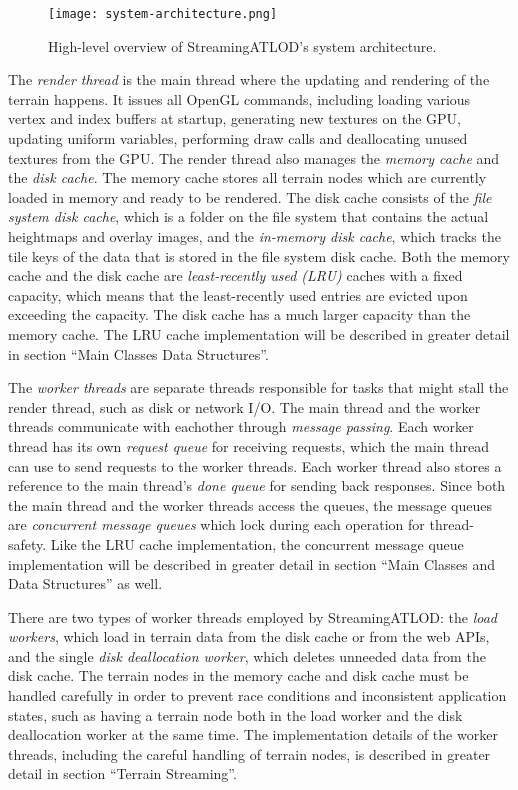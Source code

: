 \begin{figure}[H]
  \centering
  \texttt{[image: system-architecture.png]}
  \caption{High-level overview of StreamingATLOD's system architecture.}\label{fig:system-architecture}
\end{figure}

The \textit{render thread} is the main thread where the updating and rendering 
of the terrain happens. It issues all OpenGL commands, including loading various vertex and index buffers at startup,
generating new textures on the GPU, updating uniform variables, performing draw calls and deallocating unused textures from the GPU.
The render thread also manages the \textit{memory cache} and the \textit{disk cache}. 
The memory cache stores all terrain nodes which are  
currently loaded in memory and ready to be rendered. 
The disk cache consists of the \textit{file system disk cache}, which is a folder on the file system that contains the actual heightmaps and overlay images,
and the \textit{in-memory disk cache}, which tracks the tile keys of the data that is stored in the file system disk cache.
Both the memory cache and the disk cache 
are \textit{least-recently used (LRU)} caches with a fixed capacity, which means that 
the least-recently used entries are evicted upon exceeding the capacity. The 
disk cache has a much larger capacity than the memory cache.
The LRU cache implementation will be described in greater detail in section ``Main Classes Data Structures''.

The \textit{worker threads} are separate threads responsible for
tasks that might stall the render thread, such as disk or network I/O.
The main thread and the worker threads communicate with eachother 
through \textit{message passing}. 
Each worker thread has its own \textit{request queue}
for receiving requests, which the main thread can use to send requests
to the worker threads. 
Each worker thread also stores a reference to the main thread's \textit{done queue} for 
sending back responses. Since both the main thread and the worker threads
access the queues, the message queues are \textit{concurrent message queues} which 
lock during each operation for thread-safety. Like the LRU cache implementation, the 
concurrent message queue implementation will be described in greater detail 
in section ``Main Classes and Data Structures'' as well.

There are two types of worker threads employed by StreamingATLOD:
the \textit{load workers}, which load in terrain data from the disk cache 
or from the web APIs, and the single \textit{disk deallocation worker},
which deletes unneeded data from the disk cache.
The terrain nodes in the memory cache and disk cache must be handled 
carefully in order to prevent race conditions and inconsistent application states, such as 
having a terrain node both in the load worker and the disk deallocation worker at the same time.
The implementation details of the worker threads, including the careful handling 
of terrain nodes, is described in greater detail in section ``Terrain Streaming''.

